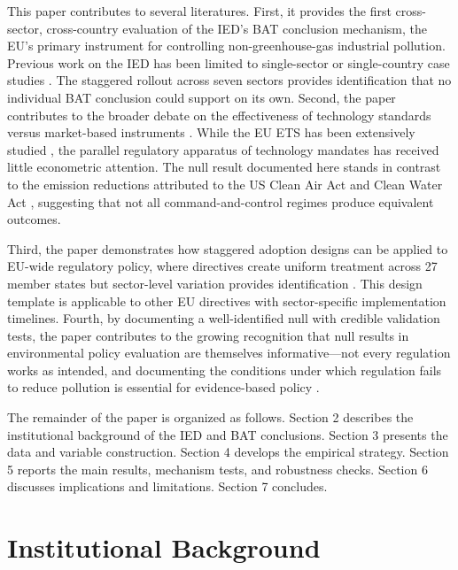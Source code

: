 \documentclass[12pt]{article}
\begin{document}
This paper contributes to several literatures. First, it provides the first cross-sector, cross-country evaluation of the IED's BAT conclusion mechanism, the EU's primary instrument for controlling non-greenhouse-gas industrial pollution. Previous work on the IED has been limited to single-sector or single-country case studies \citep{european_commission2020}. The staggered rollout across seven sectors provides identification that no individual BAT conclusion could support on its own. Second, the paper contributes to the broader debate on the effectiveness of technology standards versus market-based instruments \citep{jaffe1995, hepburn2006, porter1995}. While the EU ETS has been extensively studied \citep{martin2016, calel2020ets, delogu2022}, the parallel regulatory apparatus of technology mandates has received little econometric attention. The null result documented here stands in contrast to the emission reductions attributed to the US Clean Air Act \citep{greenstone2004} and Clean Water Act \citep{keiser2019, colmer2024}, suggesting that not all command-and-control regimes produce equivalent outcomes.

Third, the paper demonstrates how staggered adoption designs can be applied to EU-wide regulatory policy, where directives create uniform treatment across 27 member states but sector-level variation provides identification \citep{goodmanbacon2021, borusyak2024}. This design template is applicable to other EU directives with sector-specific implementation timelines. Fourth, by documenting a well-identified null with credible validation tests, the paper contributes to the growing recognition that null results in environmental policy evaluation are themselves informative---not every regulation works as intended, and documenting the conditions under which regulation fails to reduce pollution is essential for evidence-based policy \citep{dechezlepretre2022}.

The remainder of the paper is organized as follows. Section 2 describes the institutional background of the IED and BAT conclusions. Section 3 presents the data and variable construction. Section 4 develops the empirical strategy. Section 5 reports the main results, mechanism tests, and robustness checks. Section 6 discusses implications and limitations. Section 7 concludes.


\section{Institutional Background}
\end{document}

